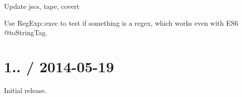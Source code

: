 \begin{DoxyItemize}
\item Update {\ttfamily jscs}, {\ttfamily tape}, {\ttfamily covert}
\item Use Reg\+Exp\+::exec to test if something is a regex, which works even with E\+S6 @to\+String\+Tag.
\end{DoxyItemize}

\section*{1.. / 2014-\/05-\/19 }


\begin{DoxyItemize}
\item Initial release. 
\end{DoxyItemize}